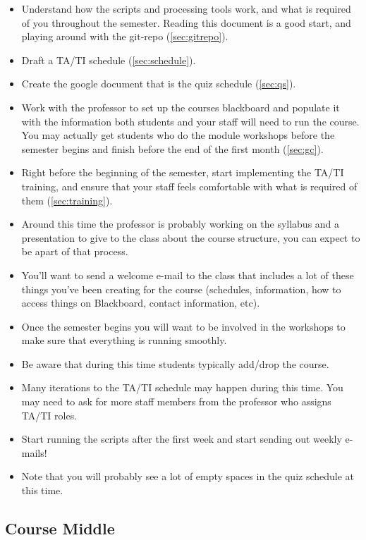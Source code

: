 \documentclass[12pt]{article}
\begin{document}
\begin{itemize}
	\item Understand how the scripts and processing tools work, and what is required of you throughout the semester. Reading this document is a good start, and playing around with the git-repo (\ref{sec:gitrepo}).
	\item Draft a TA/TI schedule (\ref{sec:schedule}).
	\item Create the google document that is the quiz schedule (\ref{sec:qs}).
	\item Work with the professor to set up the courses blackboard and populate it with the information both students and your staff will need to run the course. You may actually get students who do the module workshops before the semester begins and finish before the end of the first month (\ref{sec:gc}).
	\item Right before the beginning of the semester, start implementing the TA/TI training, and ensure that your staff feels comfortable with what is required of them (\ref{sec:training}).
	\item Around this time the professor is probably working on the syllabus and a presentation to give to the class about the course structure, you can expect to be apart of that process.
	\item You'll want to send a welcome e-mail to the class that includes a lot of these things you've been creating for the course (schedules, information, how to access things on Blackboard, contact information, etc).
	\item Once the semester begins you will want to be involved in the workshops to make sure that everything is running smoothly.
	\item Be aware that during this time students typically add/drop the course.
	\item Many iterations to the TA/TI schedule may happen during this time. You may need to ask for more staff members from the professor who assigns TA/TI roles.
	\item Start running the scripts after the first week and start sending out weekly e-mails!
	\item Note that you will probably see a lot of empty spaces in the quiz schedule at this time.
\end{itemize}

\subsection{Course Middle} \label{sec:cm}
\end{document}

